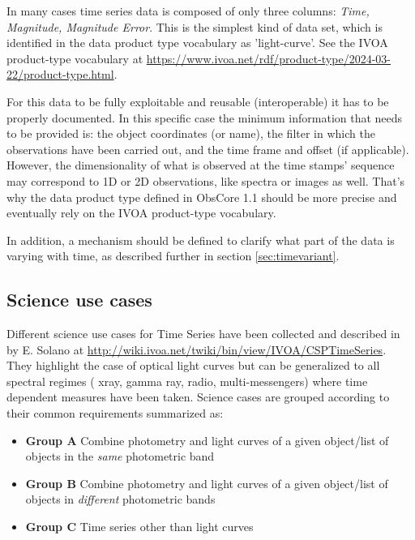 \documentclass[11pt,a4paper]{ivoa}
\begin{document}
In many cases time series data is composed of only three columns: \emph{Time, Magnitude, Magnitude Error}.
This is the simplest kind of data set,  which is identified in the data product type vocabulary as 'light-curve'.
See the IVOA product-type vocabulary at \url{https://www.ivoa.net/rdf/product-type/2024-03-22/product-type.html}.

For this data to be fully exploitable and reusable (interoperable) it has to be properly documented. In this specific case the minimum information that needs to be provided is: the object coordinates (or name), the filter in which the observations have been carried out, and the time frame and offset (if applicable).
However, the dimensionality of what is observed at the time stamps' sequence may correspond to 1D or 2D observations, like spectra or images  as well.
That's why the data product type  defined in ObsCore 1.1 should be more precise and eventually rely on the IVOA product-type vocabulary.

In addition, a mechanism should be defined to clarify what part of the data is varying with time, as described further in section \ref{sec:timevariant}.

\subsection{Science use cases}
\label{sect:usecases}
Different science use cases for Time Series have been collected and described in by E. Solano  at \url{http://wiki.ivoa.net/twiki/bin/view/IVOA/CSPTimeSeries}.
They highlight the case of optical light curves but can be generalized to all spectral regimes ( xray, gamma ray, radio, multi-messengers)  where time dependent measures have been taken.
Science cases are grouped according to their common requirements summarized as:
\begin{itemize}
\item \textbf{Group A} Combine photometry and light curves of a given object/list of objects in the \emph{same} photometric band
\item \textbf{Group B} Combine photometry and light curves of a given object/list of objects in \emph{different} photometric bands
\item \textbf{Group C} Time series other than light curves
\end{itemize}
\end{document}
